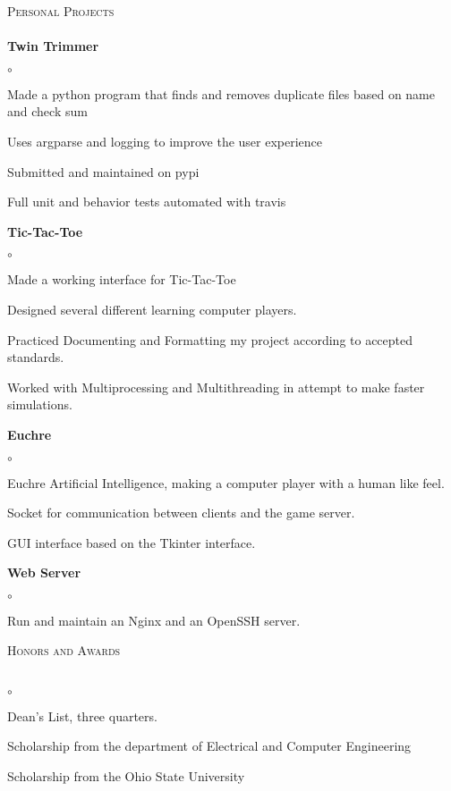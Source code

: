 \documentclass{article}
\newcommand{\lineunder}{\vspace*{-8pt} \\ \hspace*{-18pt} \hrulefill \\}
\newcommand{\header}[1]{{\hspace*{-15pt}\vspace*{6pt} \textsc{#1}} \vspace*{-6pt} \lineunder}
\newcommand{\project}[1]{{ \textbf{#1}  }}
\newenvironment{achievements}{\begin{list}{$\circ$}{\topsep 0pt \itemsep -2pt}}{\vspace*{4pt}\end{list}}
\begin{document}
\header{Personal Projects}
\project{Twin Trimmer}
	\begin{achievements}
	\item Made a python program that finds and removes duplicate files based on name and check sum
	\item Uses argparse and logging to improve the user experience
  \item Submitted and maintained on pypi
  \item Full unit and behavior tests automated with travis
	\end{achievements}
\project{Tic-Tac-Toe}
	\begin{achievements}
	\item Made a working interface for Tic-Tac-Toe
	\item Designed several different learning computer players.
	\item Practiced Documenting and Formatting my project according to
	accepted standards.
	\item Worked with Multiprocessing and  Multithreading in attempt to
	make faster simulations.
	\end{achievements}

\project{Euchre}
	\begin{achievements}
	\item Euchre Artificial Intelligence, making a computer player with
a human like feel.
	\item Socket for communication between clients and the game server.
	\item GUI interface based on the Tkinter interface.
	\end{achievements}

\project{Web Server}
	\begin{achievements}
	\item Run and maintain an Nginx and an OpenSSH server.
	\end{achievements}

\newpage

\header{Honors and Awards}
\begin{achievements}
	\item Dean's List, three quarters.
	\item Scholarship from the department of Electrical and Computer Engineering
	\item Scholarship from the Ohio State University
\end{achievements}
\end{document}
